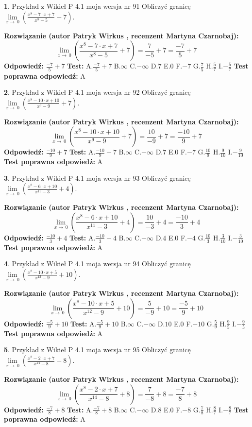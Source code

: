 \documentclass[12pt, a4paper]{article}
\theoremstyle{definition} %
\newtheorem{zad}{}
\newcommand{\zadStart}[1]{\begin{zad}#1\newline}
\newcommand{\zadStop}{\end{zad}}
\newcommand{\rozwStart}[2]{\noindent \textbf{Rozwiązanie (autor #1 , recenzent #2): }\newline}
\newcommand{\rozwStop}{\newline}
\newcommand{\odpStart}{\noindent \textbf{Odpowiedź:}\newline}
\newcommand{\odpStop}{\newline}
\newcommand{\testStart}{\noindent \textbf{Test:}\newline}
\newcommand{\testStop}{\newline}
\newcommand{\kluczStart}{\noindent \textbf{Test poprawna odpowiedź:}\newline}
\newcommand{\kluczStop}{\newline}
\begin{document}
\zadStart{Przykład z Wikieł P 4.1 moja wersja nr 91}
Obliczyć granicę $\lim\limits_{x\to\ 0}(\frac{x^{8}-7 \cdot x +7}{x^{8}-5}+7)$.
\zadStop
\rozwStart{Patryk Wirkus}{Martyna Czarnobaj}
$$\lim\limits_{x\to\ 0}(\frac{x^{8}-7 \cdot x +7}{x^{8}-5}+7)=\frac{7}{-5}+7=\frac{-7}{5}+7$$
\rozwStop
\odpStart
$\frac{-7}{5}+7$
\odpStop
\testStart
A.$\frac{-7}{5}+7$
B.$\infty$
C.$-\infty$
D.$7$
E.$0$
F.$-7$
G.$\frac{7}{5}$
H.$\frac{5}{7}$
I.$-\frac{5}{7}$
\testStop
\kluczStart
A
\kluczStop



\zadStart{Przykład z Wikieł P 4.1 moja wersja nr 92}
Obliczyć granicę $\lim\limits_{x\to\ 0}(\frac{x^{8}-10 \cdot x +10}{x^{9}-9}+7)$.
\zadStop
\rozwStart{Patryk Wirkus}{Martyna Czarnobaj}
$$\lim\limits_{x\to\ 0}(\frac{x^{8}-10 \cdot x +10}{x^{9}-9}+7)=\frac{10}{-9}+7=\frac{-10}{9}+7$$
\rozwStop
\odpStart
$\frac{-10}{9}+7$
\odpStop
\testStart
A.$\frac{-10}{9}+7$
B.$\infty$
C.$-\infty$
D.$7$
E.$0$
F.$-7$
G.$\frac{10}{9}$
H.$\frac{9}{10}$
I.$-\frac{9}{10}$
\testStop
\kluczStart
A
\kluczStop



\zadStart{Przykład z Wikieł P 4.1 moja wersja nr 93}
Obliczyć granicę $\lim\limits_{x\to\ 0}(\frac{x^{8}-6 \cdot x +10}{x^{11}-3}+4)$.
\zadStop
\rozwStart{Patryk Wirkus}{Martyna Czarnobaj}
$$\lim\limits_{x\to\ 0}(\frac{x^{8}-6 \cdot x +10}{x^{11}-3}+4)=\frac{10}{-3}+4=\frac{-10}{3}+4$$
\rozwStop
\odpStart
$\frac{-10}{3}+4$
\odpStop
\testStart
A.$\frac{-10}{3}+4$
B.$\infty$
C.$-\infty$
D.$4$
E.$0$
F.$-4$
G.$\frac{10}{3}$
H.$\frac{3}{10}$
I.$-\frac{3}{10}$
\testStop
\kluczStart
A
\kluczStop



\zadStart{Przykład z Wikieł P 4.1 moja wersja nr 94}
Obliczyć granicę $\lim\limits_{x\to\ 0}(\frac{x^{8}-10 \cdot x +5}{x^{12}-9}+10)$.
\zadStop
\rozwStart{Patryk Wirkus}{Martyna Czarnobaj}
$$\lim\limits_{x\to\ 0}(\frac{x^{8}-10 \cdot x +5}{x^{12}-9}+10)=\frac{5}{-9}+10=\frac{-5}{9}+10$$
\rozwStop
\odpStart
$\frac{-5}{9}+10$
\odpStop
\testStart
A.$\frac{-5}{9}+10$
B.$\infty$
C.$-\infty$
D.$10$
E.$0$
F.$-10$
G.$\frac{5}{9}$
H.$\frac{9}{5}$
I.$-\frac{9}{5}$
\testStop
\kluczStart
A
\kluczStop



\zadStart{Przykład z Wikieł P 4.1 moja wersja nr 95}
Obliczyć granicę $\lim\limits_{x\to\ 0}(\frac{x^{8}-2 \cdot x +7}{x^{14}-8}+8)$.
\zadStop
\rozwStart{Patryk Wirkus}{Martyna Czarnobaj}
$$\lim\limits_{x\to\ 0}(\frac{x^{8}-2 \cdot x +7}{x^{14}-8}+8)=\frac{7}{-8}+8=\frac{-7}{8}+8$$
\rozwStop
\odpStart
$\frac{-7}{8}+8$
\odpStop
\testStart
A.$\frac{-7}{8}+8$
B.$\infty$
C.$-\infty$
D.$8$
E.$0$
F.$-8$
G.$\frac{7}{8}$
H.$\frac{8}{7}$
I.$-\frac{8}{7}$
\testStop
\kluczStart
A
\kluczStop
\end{document}
